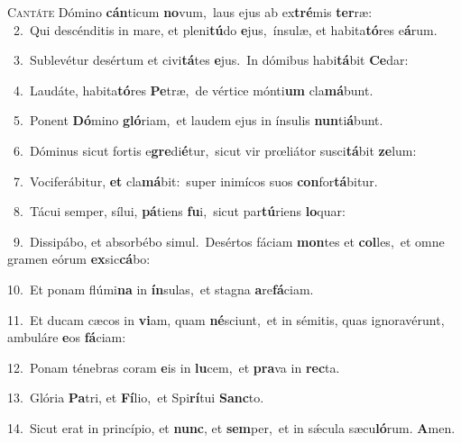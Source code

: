 \lettrine{\initial\textcolor{\initialcolor}{C}}{antáte} Dómino \textbf{cán}\-ticum \textbf{no}\-vum,~\star laus ejus ab ex\-\textbf{tré}\-mis \textbf{ter}\-ræ:\\
{\numbfont\textcolor{\numbcolor}{~2.}}~Qui descénditis in mare, et pleni\-\textbf{tú}\-do \textbf{e}\-jus,~\star ínsulæ, et habita\-\textbf{tó}\-res e\-\textbf{á}\-rum.\par
{\numbfont\textcolor{\numbcolor}{~3.}}~Sublevétur desértum et civi\-\textbf{tá}\-tes \textbf{e}\-jus.~\star In dómibus habi\-\textbf{tá}\-bit \textbf{Ce}\-dar:\par
{\numbfont\textcolor{\numbcolor}{~4.}}~Laudáte, habita\-\textbf{tó}\-res \textbf{Pe}\-træ,~\star de vértice mónti\textbf{um} cla\-\textbf{má}\-bunt.\par
{\numbfont\textcolor{\numbcolor}{~5.}}~Ponent \textbf{Dó}\-mino \textbf{gló}\-riam,~\star et laudem ejus in ínsulis \textbf{nun}\-ti\-\textbf{á}\-bunt.\par
{\numbfont\textcolor{\numbcolor}{~6.}}~Dóminus sicut fortis e\-\textbf{gre}\-di\-\textbf{é}\-tur,~\star sicut vir prœliátor susci\-\textbf{tá}\-bit \textbf{ze}\-lum:\par
{\numbfont\textcolor{\numbcolor}{~7.}}~Vociferábitur, \textbf{et} cla\-\textbf{má}\-bit:~\star super inimícos suos \textbf{con}\-for\-\textbf{tá}\-bitur.\par
{\numbfont\textcolor{\numbcolor}{~8.}}~Tácui semper, sílui, \textbf{pá}\-tiens \textbf{fu}\-i,~\star sicut par\-\textbf{tú}\-riens \textbf{lo}\-quar:\par
{\numbfont\textcolor{\numbcolor}{~9.}}~Dissipábo, et absorbébo simul.~\dagger Desértos fáciam \textbf{mon}\-tes et \textbf{col}\-les,~\star et omne gramen eórum \textbf{ex}\-sic\-\textbf{cá}\-bo:\par
{\numbfont\textcolor{\numbcolor}{10.}}~Et ponam flúmi\textbf{na} in \textbf{ín}\-sulas,~\star et stagna \textbf{a}\-re\-\textbf{fá}\-ciam.\par
{\numbfont\textcolor{\numbcolor}{11.}}~Et ducam cæcos in \textbf{vi}\-am, quam \textbf{né}\-sciunt,~\star et in sémitis, quas ignoravérunt, ambuláre \textbf{e}\-os \textbf{fá}\-ciam:\par
{\numbfont\textcolor{\numbcolor}{12.}}~Ponam ténebras coram \textbf{e}\-is in \textbf{lu}\-cem,~\star et \textbf{pra}\-va in \textbf{rec}\-ta.\par
{\numbfont\textcolor{\numbcolor}{13.}}~Glória \textbf{Pa}\-tri, et \textbf{Fí}\-lio,~\star et Spi\-\textbf{rí}\-tui \textbf{Sanc}\-to.\par
{\numbfont\textcolor{\numbcolor}{14.}}~Sicut erat in princípio, et \textbf{nunc}\-, et \textbf{sem}\-per,~\star et in sǽcula sæcu\-\textbf{ló}\-rum. \textbf{A}\-men.\par
